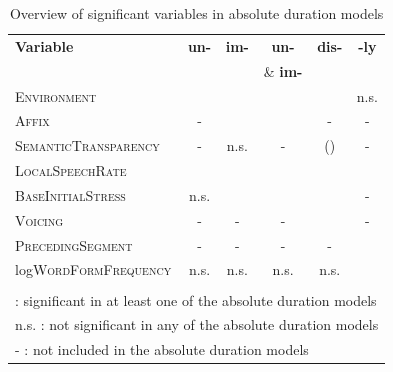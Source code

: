 \begin{table}[b!]
	\caption{Overview of significant variables in absolute duration models}
	\label{tbl: Overview of results in the corpus study}
	\centering
	\begin{center}
		\begin{tabular} {lccccc}
			
			
			\textbf{Variable} & \textbf{un-} & \textbf{im-} &\textbf{un-} &\textbf{dis-}& \textbf{-ly}\\
			& & &\& \textbf{im-}  && \\
			\midrule			
			\textsc{Environment}& \checkmark & \checkmark  & \checkmark & \checkmark & n.s. \\ 
			\textsc{Affix }&- &\checkmark  & \checkmark  &- & -\\ 
			
			\textsc{SemanticTransparency}&-& n.s. &  - & (\checkmark) & - \\
			\textsc{LocalSpeechRate}&\checkmark & \checkmark & \checkmark  &\checkmark  & \checkmark \\			
			\textsc{BaseInitialStress}&n.s.& \checkmark & \checkmark & \checkmark &-\\
			\textsc{Voicing}& - & - & - &\checkmark  & - \\
			\textsc{PrecedingSegment}&-& -& - & - &\checkmark\\
			log\textsc{WordFormFrequency}&n.s.& n.s.& n.s. & n.s.&\checkmark\\
			
			\midrule\\
			
			\multicolumn{6}{l}{\small \checkmark \hspace*{0.2cm}: significant in at least one of the absolute duration models} \\			
			\multicolumn{6}{l}{\small n.s. : not significant in any of the absolute duration models} \\			
			\multicolumn{6}{l}{\small - \hspace*{0.45cm}: not included in the absolute duration models} \\			
			
		\end{tabular}
	\end{center}
	
	
	\vspace*{-0.7cm}
\end{table}


